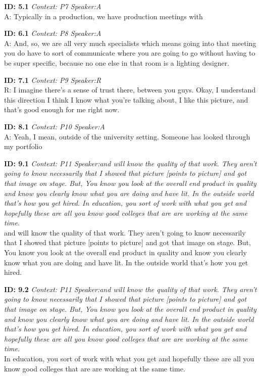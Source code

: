 \documentclass[10pt]{book}
\begin{document}
\begin{landscape}
\textbf{ID: 5.1} \emph{Context: P7 Speaker:A}\\ 
A: Typically in a production, we have production meetings with \newpage 

\textbf{ID: 6.1} \emph{Context: P8 Speaker:A}\\ 
A: And, so, we are all very much specialists which means going into that meeting you do have to sort of communicate where you are going to go without having to be super specific, because no one else in that room is a lighting designer. \newpage 

\textbf{ID: 7.1} \emph{Context: P9 Speaker:R}\\ 
R: I imagine there's a sense of trust there, between you guys. Okay, I understand this direction I think I know what you're talking about, I like this picture, and that's good enough for me right now. \newpage 

\textbf{ID: 8.1} \emph{Context: P10 Speaker:A}\\ 
A: Yeah, I mean, outside of the university setting. Someone has looked through my portfolio \newpage 

\textbf{ID: 9.1} \emph{Context: P11 Speaker:and will know the quality of that work. They aren't going to know necessarily that I showed that picture [points to picture] and got that image on stage. But, You know you look at the overall end product in quality and know you clearly know what you are doing and have lit. In the outside world that's how you get hired. In education, you sort of work with what you get and hopefully these are all you know good colleges that are are working at the same time.}\\ 
and will know the quality of that work. They aren't going to know necessarily that I showed that picture [points to picture] and got that image on stage. But, You know you look at the overall end product in quality and know you clearly know what you are doing and have lit. In the outside world that's how you get hired. \newpage 

\textbf{ID: 9.2} \emph{Context: P11 Speaker:and will know the quality of that work. They aren't going to know necessarily that I showed that picture [points to picture] and got that image on stage. But, You know you look at the overall end product in quality and know you clearly know what you are doing and have lit. In the outside world that's how you get hired. In education, you sort of work with what you get and hopefully these are all you know good colleges that are are working at the same time.}\\ 
In education, you sort of work with what you get and hopefully these are all you know good colleges that are are working at the same time. \newpage 


\end{landscape}
\end{document}
